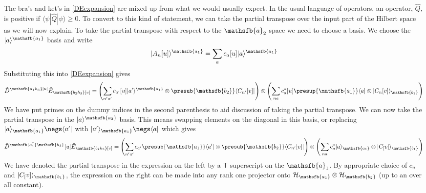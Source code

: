 \documentclass[10pt]{article}
\begin{document}
The bra's and ket's in \eqref{DEexpansion} are mixed up from what we would usually expect.  In the usual language of operators, an operator, $\hat Q$, is positive if $\langle \psi|\hat{Q}|\psi\rangle\geq 0$.  To convert to this kind of statement, we can take the partial transpose over the input part of the Hilbert space as we will now explain.  To take the partial transpose with respect to the $\mathsfb{a}_2$ space we need to choose a basis.  We choose the $|a\rangle^\mathsfb{a_1}$ basis and write
\begin{equation}
|A_n[u]\rangle^\mathsfb{a_1} = \sum_a c_a[u] |a\rangle^\mathsfb{a_1}
\end{equation}
Substituting this into \eqref{DEexpansion} gives
\begin{equation}
\hat{D}^\mathsfb{a_1h_3}[u] \hat{E}_\mathsfb{b_2h_3}[v]
=
\left( \sum_{n'a'} c_{a'}[u]    |a'\rangle^\mathsfb{a_1} \otimes \presub{\mathsfb{b_2}}\langle C_{n'}[v]| \right)
\otimes
\left( \sum_{na} c_a^*[u]  \presup{\mathsfb{a_1}}\langle a| \otimes |C_n[v]\rangle_\mathsfb{b_1} \right)
\end{equation}
We have put primes on the dummy indices in the second parenthesis to aid discussion of taking the partial transpose.  We can now take the partial transpose in the $|a\rangle^\mathsfb{a_2}$ basis.  This means swapping elements on the diagonal in this basis, or replacing $|a\rangle_\mathsfb{a_1}\negs\langle a'|$ with $|a'\rangle_\mathsfb{a_1}\negs\langle a|$ which gives
\begin{equation}\label{DEexpansiontranspose}
\hat{D}^{\mathsfb{a_1^\mathsf{T}}\mathsfb{h_3}}[u] \hat{E}_\mathsfb{b_2h_3}[v]
=
\left( \sum_{n'a'} c_{a'}    \presub{\mathsfb{a_1}}\langle a'| \otimes \presub{\mathsfb{b_2}}\langle C_{n'}[v]| \right)
\otimes
\left( \sum_{na} c_a^*        |a\rangle_\mathsfb{a_1} \otimes |C_[v]\rangle_\mathsfb{b_1} \right)
\end{equation}
We have denoted the partial transpose in the expression on the left by a $\mathsf T$ superscript on the $\mathsfb{a}_1$.  By appropriate choice of $c_n$ and $|C_[v]\rangle_\mathsfb{b_1}$, the expression on the right can be made into any rank one projector onto $\mathcal{H}_\mathsfb{a_1}\otimes\mathcal{H}_\mathsfb{b_2}$ (up to an over all constant).
\end{document}
